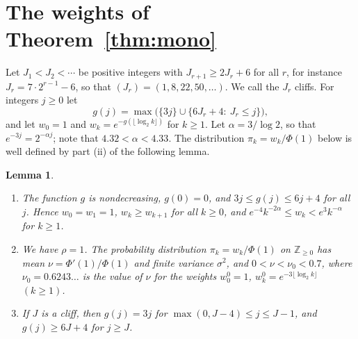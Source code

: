 \documentclass[11pt]{amsart}
\newtheorem{lemma}[theorem]{Lemma}
\theoremstyle{remark}
\numberwithin{equation}{section}
\newcommand{\Z}{\mathbb Z}
\begin{document}
\section{The weights of Theorem~\ref{thm:mono}}\label{sec:weights}

Let $J_1<J_2<\cdots$ be positive integers with $J_{r+1}\ge2J_r+6$ for all $r$, for instance $J_r=7\cdot2^{r-1}-6$, so that $(J_r)=(1,8,22,50,\dots)$. We call the $J_r$ cliffs. For integers $j\ge0$ let
\[
g(j)=\max\bigl(\{3j\}\cup\{6J_r+4:\ J_r\le j\}\bigr),
\]
and let $w_0=1$ and $w_k=e^{-g(\lfloor\log_2k\rfloor)}$ for $k\ge1$. Let $\alpha=3/\log2$, so that $e^{-3j}=2^{-\alpha j}$; note that $4.32<\alpha<4.33$. The distribution $\pi_k=w_k/\Phi(1)$ below is well defined by part (ii) of the following lemma.

\begin{lemma}\label{lem:weights}
\begin{enumerate}[label=\textup{(\roman*)},leftmargin=*]
\item The function $g$ is nondecreasing, $g(0)=0$, and $3j\le g(j)\le6j+4$ for all $j$. Hence $w_0=w_1=1$, $w_k\ge w_{k+1}$ for all $k\ge0$, and $e^{-4}k^{-2\alpha}\le w_k<e^3k^{-\alpha}$ for $k\ge1$.
\item We have $\rho=1$. The probability distribution $\pi_k=w_k/\Phi(1)$ on $\Z_{\ge0}$ has mean $\nu=\Phi'(1)/\Phi(1)$ and finite variance $\sigma^2$, and $0<\nu<\nu_0<0.7$, where $\nu_0=0.6243\ldots$ is the value of $\nu$ for the weights $w^0_0=1$, $w^0_k=e^{-3\lfloor\log_2k\rfloor}$ $(k\ge1)$.
\item If $J$ is a cliff, then $g(j)=3j$ for $\max(0,J-4)\le j\le J-1$, and $g(j)\ge6J+4$ for $j\ge J$.
\end{enumerate}
\end{lemma}
\end{document}
